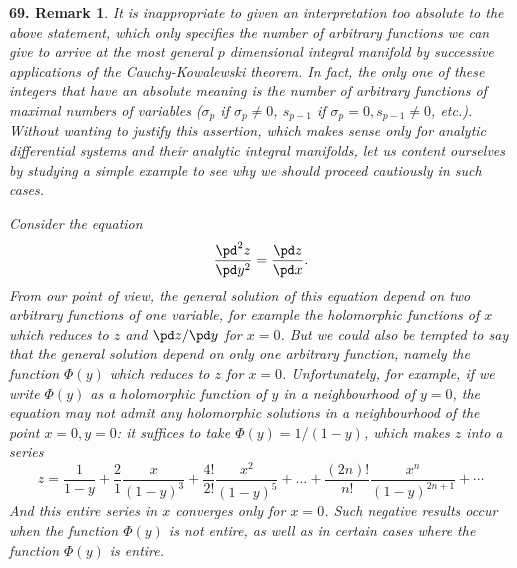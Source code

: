 \vspace{12pt}\addtocounter{frenchsec}{1}
\theoremstyle{shape0}
\newtheorem*{rmk69}{\hspace{15pt}\textbf{69.} Remark}
\begin{rmk69}
  It is inappropriate to given an interpretation too absolute to the above statement, which only specifies the number of arbitrary functions we can give to arrive at the most general $p$ dimensional integral manifold by successive applications of the Cauchy-Kowalewski theorem. In fact, the only one of these integers that have an absolute meaning is the number of arbitrary functions of maximal numbers of variables ($\sigma_{p}$ if $\sigma_{p}\neq 0$, $s_{p-1}$ if $\sigma_{p}=0, s_{p-1}\neq 0$, \emph{etc}.). Without wanting to justify this assertion, which  makes sense  only for \emph{analytic} differential systems and their \emph{analytic} integral manifolds, let us content ourselves by studying a simple example to see why  we should proceed cautiously in such cases.

Consider the equation
\[
\frac{\pd^{2}z}{\pd y^{2}}=\frac{\pd z}{\pd x}.
\]
From our point of view, the general solution of this equation depend on two arbitrary functions of one variable, for example the holomorphic functions of $x$ which reduces to $z$ and $\pd z/\pd y$ for $x=0$. But we could also be tempted to say that the general solution depend on only one arbitrary function, namely the function $\Phi(y)$ which reduces to $z$ for $x=0$. Unfortunately, for example, if we write $\Phi(y)$ as a holomorphic function of $y$ in a neighbourhood of $y=0$, the equation may not admit \emph{any} holomorphic solutions in a neighbourhood of the point $x=0, y=0$: it suffices to take $\Phi(y)=1/(1-y)$, which makes $z$ into a series
\[
z=\frac{1}{1-y}+\frac{2}{1}\frac{x}{(1-y)^{3}}+\frac{4!}{2!}\frac{x^{2}}{(1-y)^{5}}+\dots+\frac{(2n)!}{n!}\frac{x^{n}}{(1-y)^{2n+1}}+\cdots
\]
And this entire series in $x$ converges only for $x=0$. Such negative results occur when the function $\Phi(y)$ is not entire, as well as in certain cases where the function $\Phi(y)$ is entire.
\end{rmk69}



